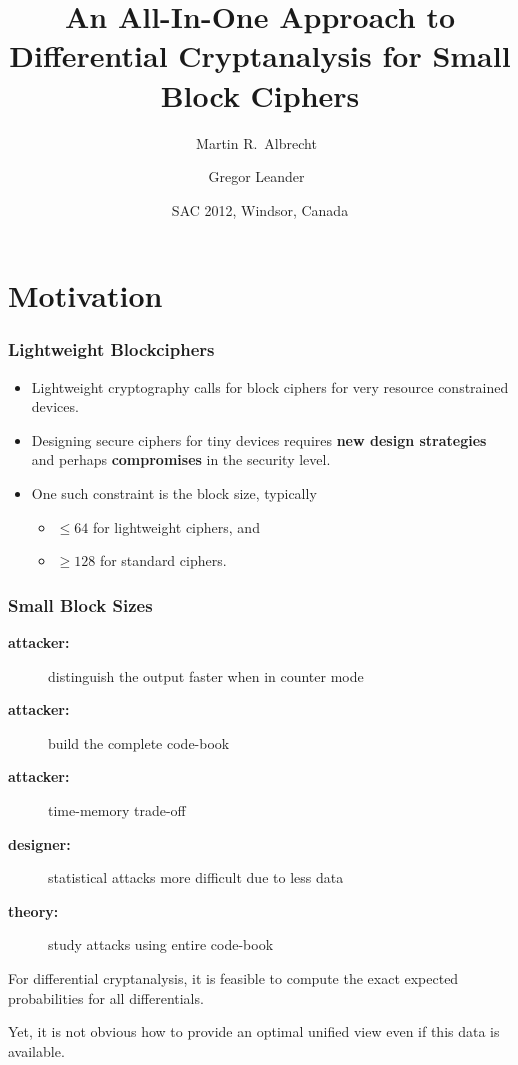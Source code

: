 \documentclass[11pt]{beamer}
\title{An All-In-One Approach to Differential Cryptanalysis for Small Block Ciphers}
\author{Martin R.\ Albrecht~\inst{1} \and Gregor Leander~\inst{2}}
\institute{1 -- POLSYS Team, UPMC, France \and 2 -- DTU, Denmark}
\date{SAC 2012, Windsor, Canada}
\newcommand{\bemph}[1]{\textbf{#1}\xspace}
\begin{document}
\begin{frame}
\titlepage
\end{frame}

\section{Motivation}

\begin{frame}
\frametitle{Lightweight Blockciphers}

\begin{itemize}
 \item Lightweight cryptography calls for block ciphers for very resource constrained devices.
 \item Designing secure ciphers for tiny devices requires \bemph{new design strategies} and perhaps \bemph{compromises} in the security level.
 \item One such constraint is the block size, typically
  \begin{itemize}
   \item $\leq 64$ for lightweight ciphers, and
   \item $\geq 128$ for standard ciphers.
  \end{itemize}
\end{itemize}

\end{frame}

\begin{frame}
\frametitle{Small Block Sizes} 

\begin{description}
 \item[{\bf\color{pink} attacker:}] distinguish the output faster when in counter mode
 \item[{\bf\color{pink} attacker:}] build the complete code-book
 \item[{\bf\color{pink} attacker:}] time-memory trade-off
 \item[{\bf\color{green} designer:}] statistical attacks more difficult due to less data
 \item[{\bf\color{orange} theory:}]   study attacks using entire code-book 
\end{description}

\begin{block}{}
For differential cryptanalysis, it is feasible to compute the exact expected probabilities for all differentials.\\
\end{block}
Yet, it is not obvious how to provide an optimal unified view even if this data is available.
\end{frame}
\end{document}
